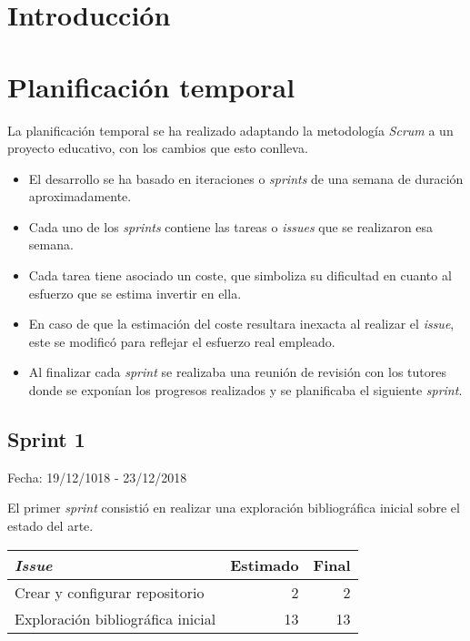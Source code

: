 
\section{Introducción}

\section{Planificación temporal}

La planificación temporal se ha realizado adaptando la metodología \textit{Scrum} a un proyecto educativo, con los cambios que esto conlleva.

\begin{itemize}
	\item El desarrollo se ha basado en iteraciones o \textit{sprints} de una semana de duración aproximadamente.
	\item  Cada uno de los \textit{sprints} contiene las tareas o \textit{issues} que se realizaron esa semana. 
	\item Cada tarea tiene asociado un coste, que simboliza su dificultad en cuanto al esfuerzo que se estima invertir en ella.
	\item En caso de que la estimación del coste resultara inexacta al realizar el \textit{issue}, este se modificó para reflejar el esfuerzo real empleado.
	\item Al finalizar cada \textit{sprint} se realizaba una reunión de revisión con los tutores donde se exponían los progresos realizados y se planificaba el siguiente \textit{sprint}.
\end{itemize}

\subsection{Sprint 1}

Fecha: 19/12/1018 - 23/12/2018

El primer \textit{sprint} consistió en realizar una exploración bibliográfica inicial sobre el estado del arte. 

\begin{table}[h]
	 \begin{tabularx}{\linewidth}{|Xrr|}
	 	\hline \textbf{\textit{Issue}} & \textbf{Estimado} & \textbf{Final}\\
	 	\hline Crear y configurar repositorio & 2 & 2 \\
	 	\hline Exploración bibliográfica inicial & 13 & 13 \\
	 	\hline
	 \end{tabularx}
\end{table}

